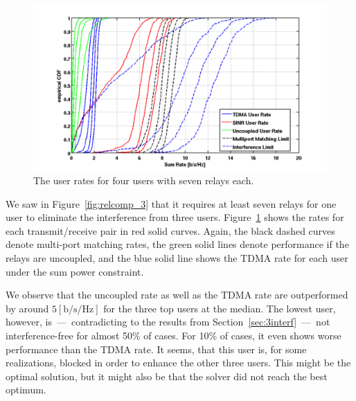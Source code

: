 \begin{figure}[h]
\centering
  \includegraphics[width=\linewidth]{images/4user_userrate.png}
\caption{The user rates for  four users with seven relays each.}
\label{fig:4user_userrate}
\end{figure}
We saw in Figure~\ref{fig:relcomp_3} that it requires at least seven relays for one user to eliminate the interference from three users.
Figure~\ref{fig:4user_userrate} shows the rates for each transmit/receive pair in red solid curves.
Again, the black dashed curves denote multi-port matching rates, the green solid lines denote performance if the relays are uncoupled, and the blue solid line shows the TDMA rate for each user under the sum power constraint.


We observe that the uncoupled rate as well as the TDMA rate are outperformed by around $5 \left[\text{b/s/Hz}\right]$ for the three top users at the median.
The lowest user, however, is~---~contradicting to the results from Section~\ref{sec:3interf}~---~not interference-free for almost 50\% of cases.
For 10\% of cases, it even shows worse performance than the TDMA rate.
It seems, that this user is, for some realizations, blocked in order to enhance the other three users.
This might be the optimal solution, but it might also be that the solver did not reach the best optimum.

